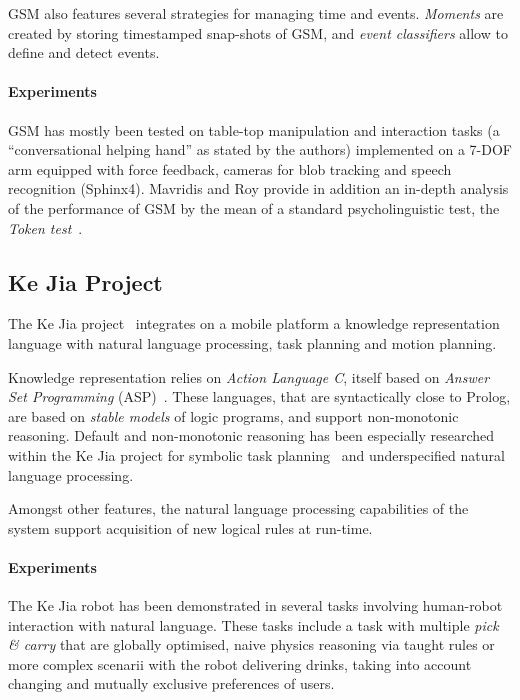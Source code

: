 \documentclass{IEEEtran}
\begin{document}
GSM also features several strategies for managing time and events.
\emph{Moments} are created by storing timestamped snap-shots of GSM, and
\emph{event classifiers} allow to define and detect events.

\paragraph{Experiments} GSM has mostly been tested on table-top manipulation
and interaction tasks (a ``conversational helping hand'' as stated by the
authors) implemented on a 7-DOF arm equipped with force feedback, cameras for blob
tracking and speech recognition (Sphinx4). Mavridis and Roy provide in addition
an in-depth analysis of the performance of GSM by the mean of a standard
psycholinguistic test, the \emph{Token test}~\cite{DiSimoni1978}.

\subsection{Ke Jia Project}
\label{sect|kejia}

The Ke Jia project~\cite{Chen2010} integrates on a mobile platform a knowledge
representation language with natural language processing, task planning and
motion planning.

Knowledge representation relies on \emph{Action Language C}, itself based on
\emph{Answer Set Programming} (ASP)~\cite{Gelfond2008}. These languages, that
are syntactically close to Prolog, are based on \emph{stable models} of logic
programs, and support non-monotonic reasoning. Default and non-monotonic
reasoning has been especially researched within the Ke Jia project for symbolic
task planning~\cite{Ji2011} and underspecified natural language processing.

Amongst other features, the natural language processing capabilities of the
system support acquisition of new logical rules at run-time.

\paragraph{Experiments} The Ke Jia robot has been demonstrated in several tasks
involving human-robot interaction with natural language. These tasks include a
task with multiple \emph{pick \& carry} that are globally optimised, naive
physics reasoning via taught rules or more complex scenarii with the robot
delivering drinks, taking into account changing and mutually exclusive
preferences of users.
\end{document}
